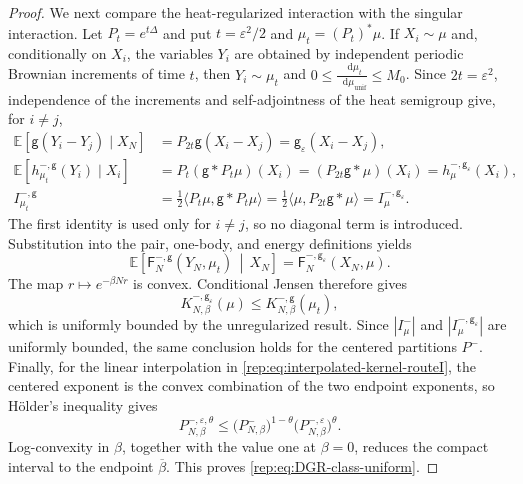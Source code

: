 \documentclass[11pt,reqno]{amsart}
\numberwithin{equation}{section}
\theoremstyle{plain}
\theoremstyle{definition}
\newcommand{\dd}{\mathop{}\!\mathrm d}
\newcommand{\E}{\mathbb E}
\newcommand{\be}{\beta}
\newcommand{\vep}{\varepsilon}
\newcommand{\g}{\mathsf g}
\newcommand{\Fr}{\mathsf F}
\newcommand{\muunif}{\mu_{\mathrm{unif}}}
\begin{document}
\begin{proof}
We next compare the heat-regularized interaction with the singular interaction.  Let $P_t=e^{t\Delta}$ and put $t=\vep^2/2$ and $\mu_t=(P_t)^*\mu$.  If $X_i\sim\mu$ and, conditionally on $X_i$, the variables $Y_i$ are obtained by independent periodic Brownian increments of time $t$, then $Y_i\sim\mu_t$ and $0\le \frac{\dd\mu_t}{\dd\muunif}\le M_0$.  Since $2t=\vep^2$, independence of the increments and self-adjointness of the heat semigroup give, for $i\ne j$,
\begin{align}\label{rep:eq:heat-component-identities}
 \E[\g(Y_i-Y_j)\mid X_N]&=P_{2t}\g(X_i-X_j)=\g_\vep(X_i-X_j),\\
 \E[h_{\mu_t}^{-,\g}(Y_i)\mid X_i]&=P_t(\g*P_t\mu)(X_i)=(P_{2t}\g*\mu)(X_i)=h_{\mu}^{-,\g_\vep}(X_i),\\
 I_{\mu_t}^{-,\g}&=\frac12\langle P_t\mu,\g*P_t\mu\rangle
 =\frac12\langle\mu,P_{2t}\g*\mu\rangle=I_{\mu}^{-,\g_\vep}.
\end{align}
The first identity is used only for $i\ne j$, so no diagonal term is introduced.  Substitution into the pair, one-body, and energy definitions yields
\begin{equation}\label{rep:eq:heat-conditional-energy}
 \mathbb E\left[\Fr_N^{-,\g}(Y_N,\mu_t)\,\middle|\,X_N\right]
 =\Fr_N^{-,\g_\vep}(X_N,\mu).
\end{equation}
The map $r\mapsto e^{-\be Nr}$ is convex.  Conditional Jensen therefore gives
\begin{equation}\label{rep:eq:heat-jensen-partition}
 K_{N,\be}^{-,\g_\vep}(\mu)
 \le K_{N,\be}^{-,\g}(\mu_t),
\end{equation}
which is uniformly bounded by the unregularized result.  Since $|I^-_\mu|$ and $|I_{\mu}^{-,\g_\vep}|$ are uniformly bounded, the same conclusion holds for the centered partitions $P^-$.  Finally, for the linear interpolation in \eqref{rep:eq:interpolated-kernel-routeI}, the centered exponent is the convex combination of the two endpoint exponents, so H\"older's inequality gives
\begin{equation}\label{rep:eq:interpolation-holder-routeI}
 P^{-,\vep,\theta}_{N,\be}
 \le
 \bigl(P^-_{N,\be}\bigr)^{1-\theta}
 \bigl(P^{-,\vep}_{N,\be}\bigr)^\theta.
\end{equation}
Log-convexity in $\be$, together with the value one at $\be=0$, reduces the compact interval to the endpoint $\overline\be$.  This proves \eqref{rep:eq:DGR-class-uniform}.
\end{proof}
\end{document}
